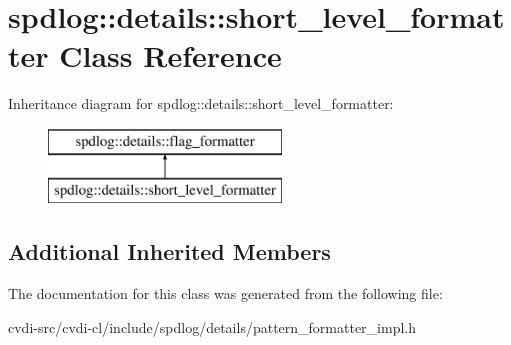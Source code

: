 \hypertarget{classspdlog_1_1details_1_1short__level__formatter}{}\section{spdlog\+:\+:details\+:\+:short\+\_\+level\+\_\+formatter Class Reference}
\label{classspdlog_1_1details_1_1short__level__formatter}
Inheritance diagram for spdlog\+:\+:details\+:\+:short\+\_\+level\+\_\+formatter\+:\begin{figure}[H]
\begin{center}
\leavevmode
\includegraphics[height=2.000000cm]{classspdlog_1_1details_1_1short__level__formatter}
\end{center}
\end{figure}
\subsection*{Additional Inherited Members}


The documentation for this class was generated from the following file\+:\begin{DoxyCompactItemize}
\item 
cvdi-\/src/cvdi-\/cl/include/spdlog/details/pattern\+\_\+formatter\+\_\+impl.\+h\end{DoxyCompactItemize}
